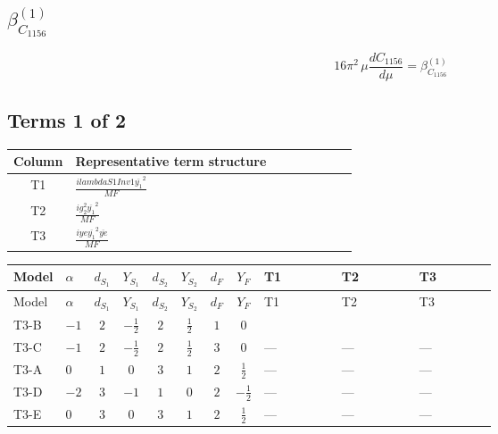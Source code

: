 \documentclass[8pt]{article}
\begin{document}
\begin{landscape}
\section*{$\beta_{C_{1156}}^{(1)}$}
\[16\pi^2\,\mu\frac{d C_{1156}}{d\mu}=\beta_{C_{1156}}^{(1)}\]
\subsection*{Terms 1 of 2}
\begin{center}
\begin{tabular}{@{}c >{\raggedright\arraybackslash}p{0.82\linewidth}@{}}
\toprule
Column & Representative term structure \\
\midrule
T1 & \(\displaystyle \frac{i lambdaS1Inv1 \overline{y_{1}}^{2}}{MF}\) \\
\midrule
T2 & \(\displaystyle \frac{i g_{2}^{2} \overline{y_{1}}^{2}}{MF}\) \\
\midrule
T3 & \(\displaystyle \frac{i ye \overline{y_{1}}^{2} \overline{ye}}{MF}\) \\
\midrule
\bottomrule
\end{tabular}
\end{center}
\smallskip
\tiny
\begin{longtable}{@{}llcccccc >{\raggedright\arraybackslash}p{0.21\linewidth} >{\raggedright\arraybackslash}p{0.21\linewidth} >{\raggedright\arraybackslash}p{0.21\linewidth}@{}}
\toprule
Model & $\alpha$ & $d_{S_1}$ & $Y_{S_1}$ & $d_{S_2}$ & $Y_{S_2}$ & $d_F$ & $Y_F$ & T1 & T2 & T3 \\
\midrule
\endfirsthead
\toprule
Model & $\alpha$ & $d_{S_1}$ & $Y_{S_1}$ & $d_{S_2}$ & $Y_{S_2}$ & $d_F$ & $Y_F$ & T1 & T2 & T3 \\
\midrule
\endhead
T3-B & $-1$ & $2$ & $-\frac{1}{2}$ & $2$ & $\frac{1}{2}$ & $1$ & $0$ & \scriptsize\adjustbox{max width=\linewidth}{$\begin{gathered} \frac{i lambdaS1Inv1 \overline{y_{1}}^{2}}{2 MF}\end{gathered}$} & \scriptsize\adjustbox{max width=\linewidth}{$\begin{gathered} \frac{3 i g_{2}^{2} \overline{y_{1}}^{2}}{4 MF}\end{gathered}$} & \scriptsize\adjustbox{max width=\linewidth}{$\begin{gathered} - \frac{i ye \overline{y_{1}}^{2} \overline{ye}}{4 MF}\end{gathered}$} \\
\midrule
T3-C & $-1$ & $2$ & $-\frac{1}{2}$ & $2$ & $\frac{1}{2}$ & $3$ & $0$ & --- & --- & --- \\
\midrule
T3-A & $0$ & $1$ & $0$ & $3$ & $1$ & $2$ & $\frac{1}{2}$ & --- & --- & --- \\
\midrule
T3-D & $-2$ & $3$ & $-1$ & $1$ & $0$ & $2$ & $-\frac{1}{2}$ & --- & --- & --- \\
\midrule
T3-E & $0$ & $3$ & $0$ & $3$ & $1$ & $2$ & $\frac{1}{2}$ & --- & --- & --- \\
\midrule
\bottomrule
\end{longtable}
\clearpage

\end{landscape}
\end{document}
